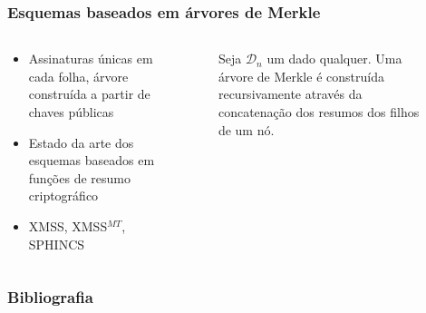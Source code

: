 \documentclass[12pt]{beamer}
\newcommand{\hash}[2][]{\mathcal{H}^{#1} (#2)}
\newcommand{\concat}{\, \vert{} \vert{} \,}
\begin{document}
\begin{frame}
  \frametitle{Esquemas baseados em árvores de Merkle}
  \begin{columns}[T]
    \begin{column}{.4\textwidth}
      \begin{itemize}
        \item Assinaturas únicas em cada folha, árvore construída a partir de
            chaves públicas
        \item Estado da arte dos esquemas baseados em funções de resumo
            criptográfico
        \item XMSS, XMSS$^{MT}$, SPHINCS
      \end{itemize}
    \end{column}
    \begin{column}{.4\textwidth}
      \begin{figure}[ht]
        \centering
        \captionsetup{font=scriptsize}
        \caption*{Seja $\mathcal{D}_n$ um dado qualquer. Uma árvore de Merkle é
          construída recursivamente através da concatenação dos resumos dos
          filhos de um nó.}
      \end{figure}
    \end{column}
  \end{columns}
\end{frame}

\begin{frame}[allowframebreaks]
  \frametitle{Bibliografia}
  
  
\end{frame}
\end{document}
